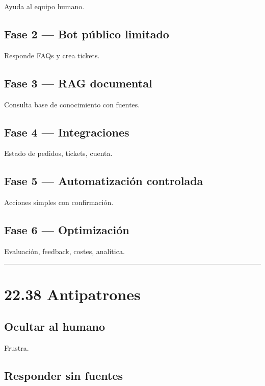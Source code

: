 Ayuda al equipo humano.

\subsection{Fase 2 --- Bot público
limitado}\label{fase-2-bot-puxfablico-limitado}

Responde FAQs y crea tickets.

\subsection{Fase 3 --- RAG documental}\label{fase-3-rag-documental}

Consulta base de conocimiento con fuentes.

\subsection{Fase 4 --- Integraciones}\label{fase-4-integraciones}

Estado de pedidos, tickets, cuenta.

\subsection{Fase 5 --- Automatización
controlada}\label{fase-5-automatizaciuxf3n-controlada}

Acciones simples con confirmación.

\subsection{Fase 6 --- Optimización}\label{fase-6-optimizaciuxf3n}

Evaluación, feedback, costes, analítica.

\begin{center}\rule{0.5\linewidth}{0.5pt}\end{center}

\section{22.38 Antipatrones}\label{antipatrones-11}

\subsection{Ocultar al humano}\label{ocultar-al-humano}

Frustra.

\subsection{Responder sin fuentes}\label{responder-sin-fuentes}

